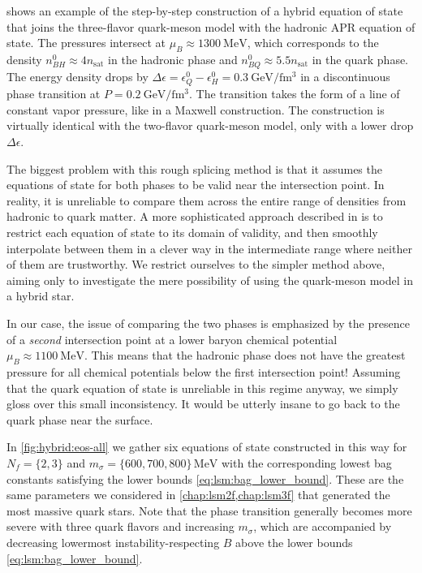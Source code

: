  shows an example of the step-by-step construction of a hybrid equation of state
that joins the three-flavor quark-meson model
with the hadronic APR equation of state.
The pressures intersect at $\mu_B \approx \SI{1300}{\mega\electronvolt}$,
which corresponds to the density $n_{BH}^0 \approx 4 n_\text{sat}$ in the hadronic phase
and $n_{BQ}^0 \approx 5.5 n_\text{sat}$ in the quark phase.
The energy density drops by $\Delta \epsilon = \epsilon_Q^0 - \epsilon_H^0 = \SI{0.3}{\giga\electronvolt\per\femto\meter\cubed}$
in a discontinuous phase transition at $P = \SI{0.2}{\giga\electronvolt\per\femto\meter\cubed}$.
The transition takes the form of a line of constant vapor pressure, like in a Maxwell construction.
The construction is virtually identical with the two-flavor quark-meson model,
only with a lower drop $\Delta \epsilon$.

The biggest problem with this rough splicing method is that it assumes the equations of state for both phases to be valid near the intersection point.
In reality, it is unreliable to compare them across the entire range of densities from hadronic to quark matter.
A more sophisticated approach described in \cite[section V-F]{ref:quark_star_review}
is to restrict each equation of state to its domain of validity,
and then smoothly interpolate between them in a clever way
in the intermediate range where neither of them are trustworthy.
We restrict ourselves to the simpler method above,
aiming only to investigate the mere possibility of using the quark-meson model in a hybrid star.

In our case,
the issue of comparing the two phases is emphasized
by the presence of a \emph{second} intersection point at a lower baryon chemical potential $\mu_B \approx \SI{1100}{\mega\electronvolt}$.
This means that the hadronic phase does not have the greatest pressure for all chemical potentials below the first intersection point!
Assuming that the quark equation of state is unreliable in this regime anyway,
we simply gloss over this small inconsistency.
It would be utterly insane to go back to the quark phase near the surface.

In \cref{fig:hybrid:eos-all} we gather six equations of state constructed in this way
for $N_f = \{2,3\}$ and $m_\sigma = \{600,700,800\} \, \si{\mega\electronvolt}$
with the corresponding lowest bag constants satisfying the lower bounds \eqref{eq:lsm:bag_lower_bound}.
These are the same parameters we considered in \cref{chap:lsm2f,chap:lsm3f} that generated the most massive quark stars.
Note that the phase transition generally becomes more severe
with three quark flavors
and increasing $m_\sigma$,
which are accompanied by decreasing lowermost instability-respecting $B$ above the lower bounds \eqref{eq:lsm:bag_lower_bound}.

